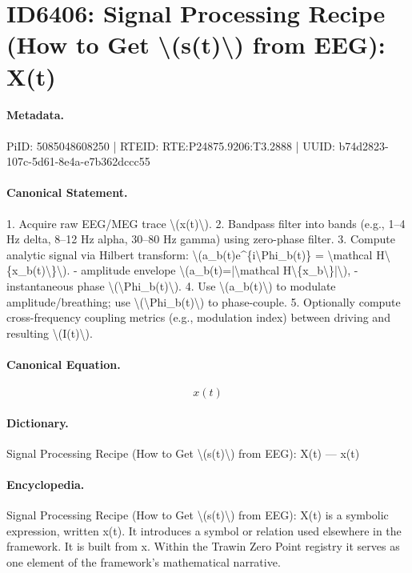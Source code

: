 \section*{ID6406: Signal Processing Recipe (How to Get \textbackslash{}(s(t)\textbackslash{}) from EEG): X(t)}
\paragraph{Metadata.}
PiID: 5085048608250 | RTEID: RTE:P24875.9206:T3.2888 | UUID: b74d2823-107c-5d61-8e4a-e7b362dccc55

\paragraph{Canonical Statement.}
1. Acquire raw EEG/MEG trace \textbackslash{}(x(t)\textbackslash{}). 2. Bandpass filter into bands (e.g., 1–4 Hz delta, 8–12 Hz alpha, 30–80 Hz gamma) using zero-phase filter. 3. Compute analytic signal via Hilbert transform: \textbackslash{}(a\_b(t)e\textasciicircum{}\{i\textbackslash{}Phi\_b(t)\} = \textbackslash{}mathcal H\textbackslash{}\{x\_b(t)\textbackslash{}\}\textbackslash{}). - amplitude envelope \textbackslash{}(a\_b(t)=|\textbackslash{}mathcal H\textbackslash{}\{x\_b\textbackslash{}\}|\textbackslash{}), - instantaneous phase \textbackslash{}(\textbackslash{}Phi\_b(t)\textbackslash{}). 4. Use \textbackslash{}(a\_b(t)\textbackslash{}) to modulate amplitude/breathing; use \textbackslash{}(\textbackslash{}Phi\_b(t)\textbackslash{}) to phase-couple. 5. Optionally compute cross-frequency coupling metrics (e.g., modulation index) between driving and resulting \textbackslash{}(I(t)\textbackslash{}).

\paragraph{Canonical Equation.}
\[
x(t)
\]

\paragraph{Dictionary.}
Signal Processing Recipe (How to Get \textbackslash{}(s(t)\textbackslash{}) from EEG): X(t) — x(t)

\paragraph{Encyclopedia.}
Signal Processing Recipe (How to Get \textbackslash{}(s(t)\textbackslash{}) from EEG): X(t) is a symbolic expression, written x(t). It introduces a symbol or relation used elsewhere in the framework. It is built from x. Within the Trawin Zero Point registry it serves as one element of the framework's mathematical narrative.
